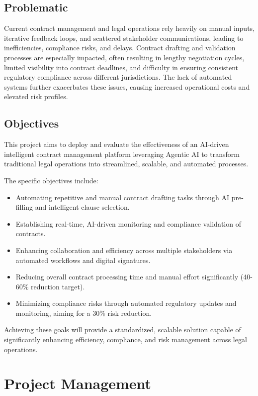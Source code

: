 \subsection{Problematic}
Current contract management and legal operations rely heavily on manual inputs, iterative feedback loops, and scattered stakeholder communications, leading to inefficiencies, compliance risks, and delays. Contract drafting and validation processes are especially impacted, often resulting in lengthy negotiation cycles, limited visibility into contract deadlines, and difficulty in ensuring consistent regulatory compliance across different jurisdictions. The lack of automated systems further exacerbates these issues, causing increased operational costs and elevated risk profiles.

\subsection{Objectives}
This project aims to deploy and evaluate the effectiveness of an AI-driven intelligent contract management platform leveraging Agentic AI to transform traditional legal operations into streamlined, scalable, and automated processes.\mynewline

The specific objectives include:
\begin{itemize}
    \item Automating repetitive and manual contract drafting tasks through AI pre-filling and intelligent clause selection.
    \item Establishing real-time, AI-driven monitoring and compliance validation of contracts.
    \item Enhancing collaboration and efficiency across multiple stakeholders via automated workflows and digital signatures.
    \item Reducing overall contract processing time and manual effort significantly (40-60\% reduction target).
    \item Minimizing compliance risks through automated regulatory updates and monitoring, aiming for a 30\% risk reduction.
\end{itemize}

Achieving these goals will provide a standardized, scalable solution capable of significantly enhancing efficiency, compliance, and risk management across legal operations.

\section{Project Management}

